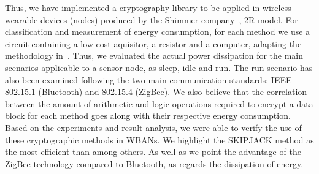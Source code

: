
Thus, we have implemented a cryptography library to be applied in wireless wearable devices (nodes) produced by the Shimmer company~\cite{burns2010shimmer}, 2R model. For classification and measurement of energy consumption, for each method we use a circuit containing a low cost aquisitor, a resistor and a computer, adapting the methodology in~\cite{bessa2017jetsonleap}. Thus, we evaluated the actual power dissipation for the main scenarios applicable to a sensor node, as sleep, idle and run. The run scenario has also been examined following the two main communication standards: IEEE 802.15.1 (Bluetooth) and 802.15.4 (ZigBee). We also believe that the correlation between the amount of arithmetic and logic operations required to encrypt a data block for each method goes along with their respective energy consumption. Based on the experiments and result analysis, we were able to verify the use of these cryptographic methods in WBANs. We highlight the SKIPJACK method as the most efficient than among others. As well as we point the advantage of the ZigBee technology compared to Bluetooth, as regards the dissipation of energy.




